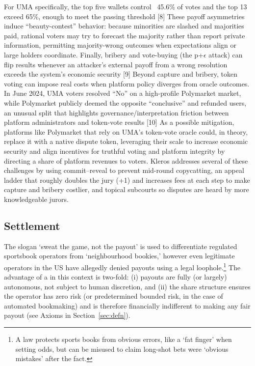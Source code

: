For UMA specifically, the top five wallets control ~45.6\% of votes and the top 13 exceed 65\%, enough to meet the passing threshold [8]
These payoff asymmetries induce “beauty-contest” behavior: because minorities are slashed and majorities paid, rational voters may try to forecast the majority rather than report private information, permitting majority-wrong outcomes when expectations align or large holders coordinate. Finally, bribery and vote-buying (the p+$\epsilon$ attack) can flip results whenever an attacker’s external payoff from a wrong resolution exceeds the system’s economic security [9]
Beyond capture and bribery, token voting can impose real costs when platform policy diverges from oracle outcomes. In June 2024, UMA voters resolved “No” on a high-profile Polymarket market, while Polymarket publicly deemed the opposite “conclusive” and refunded users, an unusual split that highlights governance/interpretation friction between platform administrators and token-vote results [10]
As a possible mitigation, platforms like Polymarket that rely on UMA’s token-vote oracle could, in theory, replace it with a native dispute token, leveraging their scale to increase economic security and align incentives for truthful voting and platform integrity by directing a share of platform revenues to voters.
Kleros addresses several of these challenges by using commit–reveal to prevent mid-round copycatting, an appeal ladder that roughly doubles the jury (+1) and increases fees at each step to make capture and bribery costlier, and topical subcourts so disputes are heard by more knowledgeable jurors.




\subsection{Settlement}\label{wf:clear}

The slogan `sweat the game, not the payout' is used to differentiate regulated sportsbook operators from `neighbourhood bookies,' however even legitimate operators in the US have allegedly denied payouts using a legal loophole.\footnote{A law protects sports books from obvious errors, like a `fat finger' when setting odds, but can be misused to claim long-shot bets were `obvious mistakes' after the fact.} The advantage of a \depm in this context is two-fold: (i) payouts are fully (or largely) autonomous, not subject to human discretion, and (ii) the share structure ensures the operator has zero risk (or predetermined bounded risk, in the case of automated bookmaking) and is therefore financially indifferent to making any fair payout (see Axioms in Section~\ref{sec:defn}).

